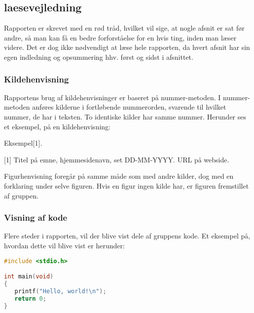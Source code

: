 \subsection{laesevejledning}
Rapporten er skrevet med en rød tråd, hvilket vil sige, at nogle afsnit er sat før andre, så man kan få en bedre forforståelse for en hvis ting, inden man læser videre. Det er dog ikke nødvendigt at læse hele rapporten, da hvert afsnit har sin egen indledning og opsummering hhv. først og sidst i afsnittet.


\subsubsection{Kildehenvisning}
Rapportens brug af kildehenvisninger er baseret på nummer-metoden. I nummer-metoden anføres kilderne i fortløbende nummerorden, svarende til hvilket nummer, de har i teksten. To identiske kilder har samme nummer. Herunder ses et eksempel, på en kildehenvisning:

Eksempel[1].

[1] Titel på emne, hjemmesidenavn, set DD-MM-YYYY.
	URL på webside.

Figurhenvisning foregår på samme måde som med andre kilder, dog med en forklaring under selve figuren. Hvis en figur ingen kilde har, er figuren fremstillet af gruppen.


\subsubsection{Visning af kode}
Flere steder i rapporten, vil der blive vist dele af gruppens kode. Et eksempel på, hvordan dette vil blive vist er herunder:

\begin{lstlisting}[language=C, caption=Kodeeksempel i C]
#include <stdio.h>

int main(void)
{
   printf("Hello, world!\n");
   return 0;
}
\end{lstlisting}